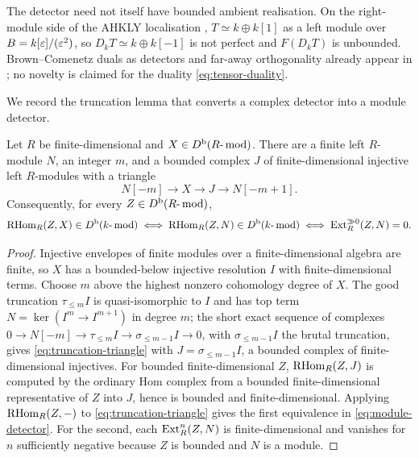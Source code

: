 \begin{remark}
The detector need not itself have bounded ambient realisation.  On the right-module side of the AHKLY localisation , \(T\simeq k\oplus k[1]\) as a left module over \(B=k[\varepsilon]/(\varepsilon^2)\), so \(D_kT\simeq k\oplus k[-1]\) is not perfect and \(F(D_kT)\) is unbounded.  Brown--Comenetz duals as detectors and far-away orthogonality already appear in \cite[Section~2]{KostasPsaroudakisVitoria25}; no novelty is claimed for the duality \eqref{eq:tensor-duality}.
\end{remark}

We record the truncation lemma that converts a complex detector into a module detector.

\begin{lemma}\label{lem:module-detector}
Let \(R\) be finite-dimensional and \(X\in D^{\mathrm b}(R\text{-}\operatorname{mod})\).  There are a finite left \(R\)-module \(N\), an integer \(m\), and a bounded complex \(J\) of finite-dimensional injective left \(R\)-modules with a triangle
\begin{equation}\label{eq:truncation-triangle}
 N[-m]\longrightarrow X\longrightarrow J\longrightarrow N[-m+1].
\end{equation}
Consequently, for every \(Z\in D^{\mathrm b}(R\text{-}\operatorname{mod})\),
\begin{equation}\label{eq:module-detector}
 \operatorname{RHom}_R(Z,X)\in D^{\mathrm b}(k\text{-}\operatorname{mod})\iff\operatorname{RHom}_R(Z,N)\in D^{\mathrm b}(k\text{-}\operatorname{mod})\iff\operatorname{Ext}^{\gg0}_R(Z,N)=0 .
\end{equation}
\end{lemma}

\begin{proof}
Injective envelopes of finite modules over a finite-dimensional algebra are finite, so \(X\) has a bounded-below injective resolution \(I\) with finite-dimensional terms.  Choose \(m\) above the highest nonzero cohomology degree of \(X\).  The good truncation \(\tau_{\le m}I\) is quasi-isomorphic to \(I\) and has top term \(N=\ker(I^m\to I^{m+1})\) in degree \(m\); the short exact sequence of complexes \(0\to N[-m]\to\tau_{\le m}I\to\sigma_{\le m-1}I\to0\), with \(\sigma_{\le m-1}I\) the brutal truncation, gives \eqref{eq:truncation-triangle} with \(J=\sigma_{\le m-1}I\), a bounded complex of finite-dimensional injectives.  For bounded finite-dimensional \(Z\), \(\operatorname{RHom}_R(Z,J)\) is computed by the ordinary Hom complex from a bounded finite-dimensional representative of \(Z\) into \(J\), hence is bounded and finite-dimensional.  Applying \(\operatorname{RHom}_R(Z,-)\) to \eqref{eq:truncation-triangle} gives the first equivalence in \eqref{eq:module-detector}.  For the second, each \(\operatorname{Ext}^n_R(Z,N)\) is finite-dimensional and vanishes for \(n\) sufficiently negative because \(Z\) is bounded and \(N\) is a module.
\end{proof}
